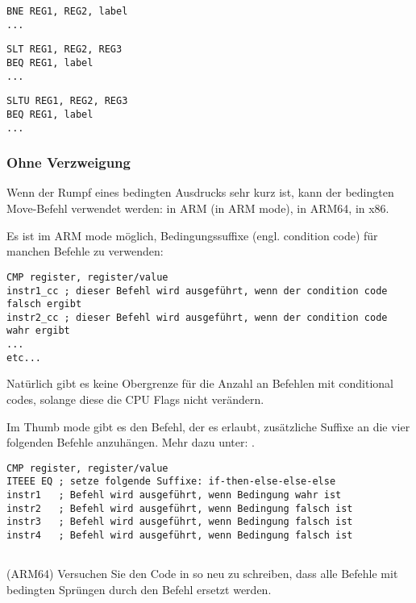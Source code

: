 \begin{lstlisting}[caption=Prüfe auf Ungleichheit,style=customasmMIPS]
BNE REG1, REG2, label
...
\end{lstlisting}
\begin{lstlisting}[caption=Prüfe auf größer{,} größer als
(vorzeichenbehaftet),style=customasmMIPS] SLT REG1, REG2, REG3
BEQ REG1, label
...
\end{lstlisting}
\begin{lstlisting}[caption=Prüfe auf kleiner{,} kleiner als
(vorzeichenlos),style=customasmMIPS] SLTU REG1, REG2, REG3
BEQ REG1, label
...
\end{lstlisting}

\subsubsection{Ohne Verzweigung}

Wenn der Rumpf eines bedingten Ausdrucks sehr kurz ist, kann der bedingten
Move-Befehl verwendet werden:
 in ARM (in ARM mode),  in ARM64,  in x86.

Es ist im ARM mode möglich, Bedingungssuffixe (engl. condition code) für manchen
Befehle zu verwenden:

\begin{lstlisting}[caption=ARM (\ARMMode),style=customasmARM]
CMP register, register/value
instr1_cc ; dieser Befehl wird ausgeführt, wenn der condition code falsch ergibt
instr2_cc ; dieser Befehl wird ausgeführt, wenn der condition code wahr ergibt
...
etc...
\end{lstlisting}
Natürlich gibt es keine Obergrenze für die Anzahl an Befehlen mit conditional
codes, solange diese die CPU Flags nicht verändern.


Im Thumb mode gibt es den  Befehl, der es erlaubt, zusätzliche Suffixe
an die vier folgenden Befehle anzuhängen. Mehr dazu unter: .


\begin{lstlisting}[caption=ARM (\ThumbMode),style=customasmARM]
CMP register, register/value
ITEEE EQ ; setze folgende Suffixe: if-then-else-else-else
instr1   ; Befehl wird ausgeführt, wenn Bedingung wahr ist
instr2   ; Befehl wird ausgeführt, wenn Bedingung falsch ist
instr3   ; Befehl wird ausgeführt, wenn Bedingung falsch ist
instr4   ; Befehl wird ausgeführt, wenn Bedingung falsch ist
\end{lstlisting}

\subsection{\Exercise}
(ARM64) Versuchen Sie den Code in  so neu zu schreiben, dass
alle Befehle mit bedingten Sprüngen durch den  Befehl ersetzt werden.

